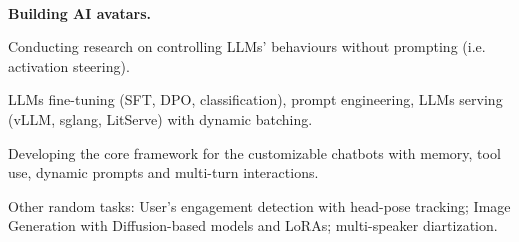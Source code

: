 \\
\vspace{-.2em}
\begin{xitemize}
    \item \textbf{Building AI avatars.}
    \begin{zitemize}
\item Conducting research on controlling LLMs' behaviours without prompting (i.e. activation steering).
\item LLMs fine-tuning (SFT, DPO, classification), prompt engineering, LLMs serving (vLLM, sglang,
LitServe) with dynamic batching.
\item Developing the core framework for the customizable chatbots with memory, tool use, dynamic
prompts and multi-turn interactions.
        \item Other random tasks: User's engagement detection with head-pose tracking; Image Generation with
Diffusion-based models and LoRAs; multi-speaker diartization.
    \end{zitemize}
\end{xitemize}

